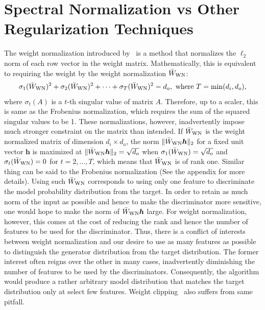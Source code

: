 \documentclass{article}
\newcommand{\bmh}{{\bm h}}
\begin{document}
\section{Spectral Normalization vs Other Regularization Techniques}\label{sec:snvsothers}
The weight normalization introduced by~\cite{salimans2016weight}
is a method that normalizes the $\ell_2$ norm of each row vector in the weight matrix. Mathematically, this is equivalent to requiring
the weight by the weight normalization $\bar{W}_{\rm WN}$:
\begin{align}
	\sigma_1(\bar{W}_{\rm WN})^2 + \sigma_2(\bar{W}_{\rm WN})^2 + \cdots + \sigma_T(\bar{W}_{\rm WN})^2 = d_o,~{\rm where}~T=\min(d_i,d_o), \label{eq:svconstraint}
\end{align}
where $\sigma_t(A)$ is a $t$-th singular value of matrix $A$. Therefore, up to a scaler, this is same as the Frobenius normalization, which requires the sum of the squared singular values to be 1.
These normalizations, however, inadvertently impose much stronger constraint on the matrix than intended.
If $\bar{W}_{\rm WN}$ is the weight normalized matrix of dimension $d_i \times d_o$, the norm $\|\bar{W}_{\rm WN}\bmh\|_2$ for a fixed unit vector $\bmh$ is maximized at $\| \bar{W}_{\rm WN} \bmh \|_2 =\sqrt{d_o}$ when $\sigma_1(\bar{W}_{\rm WN})=\sqrt{d_o}$ and $\sigma_t(\bar{W}_{\rm WN}) = 0$ for $t=2,\dots,T$, which means that  $\bar{W}_{\rm WN}$ is of rank one.
Similar thing can be said to the Frobenius normalization (See the appendix for more details).
Using such $\bar{W}_{\rm WN}$ corresponds to using only one feature to discriminate the model probability distribution from the target.
In order to retain as much norm of the input as possible and hence to make the discriminator more sensitive, one would hope to make the norm of $\bar{W}_{\rm WN}\bmh$ large.
For weight normalization, however, this comes at the cost of reducing the rank and hence the number of features to be used for the discriminator.
Thus, there is a conflict of interests between weight normalization and our desire to use as many features as possible to distinguish the generator distribution from the target distribution.
The former interest often reigns over the other in many cases, inadvertently diminishing the number of features to be used by the discriminators.
Consequently, the algorithm would produce a rather arbitrary model distribution that matches the target distribution only at select few features.
Weight clipping~\cite[]{arjovsky2017wasserstein} also suffers from same pitfall.
\end{document}
